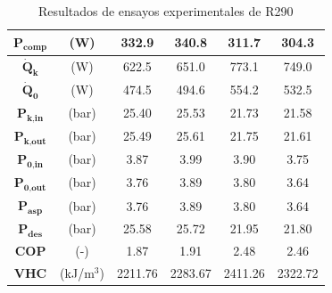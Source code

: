 \documentclass[../main.tex]{subfiles}
\begin{document}
\begin{table}[ht]
\begin{tabular}{cc|c|c|c|c|}
\hline
\multicolumn{1}{|c}{$\textbf{P}_\textbf{comp}$} & (W) & 332.9 & 340.8 & 311.7 & 304.3 \\
\hline
\multicolumn{1}{|c}{$\dot{\textbf{Q}}_\textbf{k}$} & (W) & 622.5 & 651.0 & 773.1 & 749.0 \\
\hline
\multicolumn{1}{|c}{$\dot{\textbf{Q}}_\textbf{0}$} & (W) & 474.5 & 494.6 & 554.2 & 532.5 \\
\hline
\multicolumn{1}{|c}{$\textbf{P}_\textbf{k,in}$} & (bar) & 25.40 & 25.53 & 21.73 & 21.58 \\
\hline
\multicolumn{1}{|c}{$\textbf{P}_\textbf{k,out}$} & (bar) & 25.49 & 25.61 & 21.75 & 21.61 \\
\hline
\multicolumn{1}{|c}{$\textbf{P}_\textbf{0,in}$} & (bar) & 3.87 & 3.99 & 3.90 & 3.75 \\
\hline
\multicolumn{1}{|c}{$\textbf{P}_\textbf{0,out}$} & (bar) & 3.76 & 3.89 & 3.80 & 3.64 \\
\hline
\multicolumn{1}{|c}{$\textbf{P}_\textbf{asp}$} & (bar) & 3.76 & 3.89 & 3.80 & 3.64 \\
\hline
\multicolumn{1}{|c}{$\textbf{P}_\textbf{des}$} & (bar) & 25.58 & 25.72 & 21.95 & 21.80 \\
\hline
\multicolumn{1}{|c}{$\textbf{COP}$} & (-) & 1.87 & 1.91 & 2.48 & 2.46 \\
\hline
\multicolumn{1}{|c}{$\textbf{VHC}$} & (kJ/m$^3$) & 2211.76 & 2283.67 & 2411.26 & 2322.72 \\
\hline
\end{tabular}
\caption{\centering Resultados de ensayos experimentales de R290}
\label{tab:R290_anexo}
\end{table}
\end{document}

